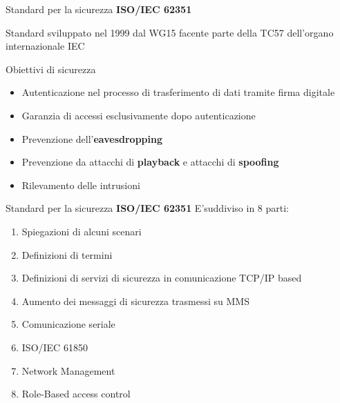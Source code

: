 \begin{frame}{Standard per la sicurezza}
\textbf{ISO/IEC 62351}
\begin{block}{}
Standard sviluppato nel 1999 dal WG15 facente parte della TC57 dell'organo internazionale IEC
\end{block}
\pause
\begin{block}{Obiettivi di sicurezza}
\begin{itemize}
	\item Autenticazione nel processo di trasferimento di dati tramite firma digitale
	\item Garanzia di accessi esclusivamente dopo autenticazione
	\item Prevenzione dell'\textbf{\color{blue_slides}eavesdropping}%
	\item Prevenzione da attacchi di \textbf{\color{blue_slides}playback} e attacchi di \textbf{\color{blue_slides}spoofing}
	\item Rilevamento delle intrusioni
\end{itemize}
\end{block}
\end{frame}

\begin{frame}{Standard per la sicurezza}
	\textbf{ISO/IEC 62351}
	\newline
	E'suddiviso in 8 parti:
	\begin{enumerate}[<+- | alert@+>]
		\item Spiegazioni di alcuni scenari
		\item Definizioni di termini
		\item Definizioni di servizi di sicurezza in comunicazione TCP/IP based
		\item Aumento dei messaggi di sicurezza trasmessi su MMS
		\item Comunicazione seriale
		\item ISO/IEC 61850 %
		\item Network Management%
		\item Role-Based access control
	\end{enumerate}
\end{frame}